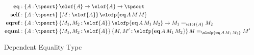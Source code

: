 \documentclass[11pt,twoside]{article}
\newcommand{\braces}[1]{\{#1\}}
\newcommand{\const}[1]{\textbf{#1}}
\newcommand{\eqclass}[3]{{#2}=_{#1}{#3}}
\newcommand{\piclass}[3]{\braces{{#2}\mathbin{:}{#1}}\,{#3}}
\newcommand{\arrclass}[2]{{#1}\to{#2}}
\newcommand{\appobj}[2]{{#1}\,{#2}}
\begin{document}
\newcommand{\eqtp}{\const{eq}}
\newcommand{\eqof}[3]{\appobj{\appobj{\appobj{\eqtp}{#1}}{#2}}{#3}}
\newcommand{\selfcon}{\const{self}}
\newcommand{\selfof}[2]{\appobj{\appobj{\selfcon}{#1}}{#2}}
\newcommand{\eqrefcon}{\const{eqref}}
\newcommand{\equnicon}{\const{equni}}

\begin{figure}
  
  \begin{align*}
    \eqtp & : \piclass{\tpsort}{A}{\arrclass{\elof{A}}{\arrclass{\elof{A}}{\tpsort}}} \\
    \selfcon & : \piclass{\tpsort}{A}{\piclass{\elof{A}}{M}{\elofp{\eqof{A}{M}{M}}}} \\
    \eqrefcon  & :
         \piclass{\tpsort}{A}{\piclass{\elof{A}}{M_{1},M_{2}}{\arrclass{\elofp{\eqof{A}{M_{1}}{M_{2}}}}{\eqclass{\elof{A}}{M_{1}}{M_{2}}}}}  \\
    \equnicon & :
          \piclass{\tpsort}{A}{\piclass{\elof{A}}{M_{1},M_{2}}{\piclass{\elofp{\eqof{A}{M_{1}}{M_{2}}}}{M,M'}{\eqclass{\elofp{\eqof{A}{M_{1}}{M_{2}}}}{M}{M'}}}}
  \end{align*}

  \caption{Dependent Equality Type}
  \label{fig:dep-eq}
\end{figure}

\newcommand{\idtp}{\const{id}}
\newcommand{\idof}[3]{\appobj{\appobj{\appobj{\idtp}{#1}}{#2}}{#3}}
\newcommand{\reflcon}{\const{refl}}
\newcommand{\reflof}[2]{\appobj{\appobj{\reflcon}{#1}}{#2}}
\newcommand{\jcon}{\const{j}}
\newcommand{\jof}[6]{\appobj{\appobj{\appobj{\appobj{\appobj{\appobj{\jcon}{#1}}{#2}}{#3}}{#4}}{#5}}{#6}}
\newcommand{\idbetacon}{\const{id-$\beta$}}
\end{document}
